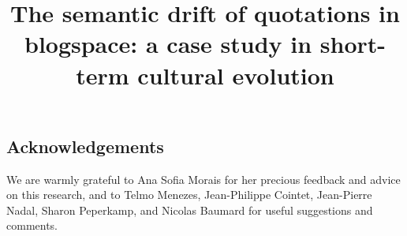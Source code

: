 \documentclass[jou]{apa6}
\title{The semantic drift of quotations in blogspace: a case study in short-term cultural evolution}
\date{}
\begin{document}
\maketitle







\subsection*{Acknowledgements}

We are warmly grateful to Ana Sofia Morais for her precious feedback and advice on this research, and to Telmo Menezes, Jean-Philippe Cointet, Jean-Pierre Nadal, Sharon Peperkamp, and Nicolas Baumard for useful suggestions and comments.




%
\end{document}

